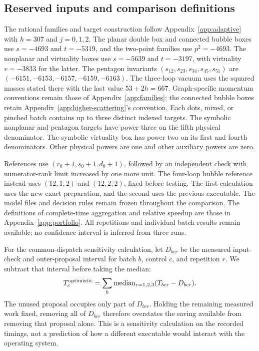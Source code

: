 \subsection{Reserved inputs and comparison definitions}
The rational families and target construction follow Appendix~\ref{app:adaptive} with $h=307$ and $j=0,1,2$. The planar double box and connected bubble boxes use $s=-4693$ and $t=-5319$, and the two-point families use $p^2=-4693$. The nonplanar and virtuality boxes use $s=-5639$ and $t=-3197$, with virtuality $v=-3833$ for the latter. The pentagon invariants $(s_{12},s_{23},s_{34},s_{45},s_{51})$ are $(-6151,-6153,-6157,-6159,-6163)$. The three-loop vacuum uses the squared masses stated there with the last value $53+2h=667$. Graph-specific momentum conventions remain those of Appendix~\ref{app:families}; the connected bubble boxes retain Appendix~\ref{app:higher-scattering}'s convention. Each dots, mixed, or pinched batch contains up to three distinct indexed targets. The symbolic nonplanar and pentagon targets have power three on the fifth physical denominator. The symbolic virtuality box has power two on its first and fourth denominators. Other physical powers are one and other auxiliary powers are zero.

References use $(r_0+1,s_0+1,d_0+1)$, followed by an independent check with numerator-rank limit increased by one more unit. The four-loop bubble reference instead uses $(12,1,2)$ and $(12,2,2)$, fixed before testing. The first calculation uses the new exact preparation, and the second uses the previous executable. The model files and decision rules remain frozen throughout the comparison. The definitions of complete-time aggregation and relative speedup are those in Appendix~\ref{app:portfolio}. All repetitions and individual batch results remain available; no confidence interval is inferred from three runs.

For the common-dispatch sensitivity calculation, let $D_{bcr}$ be the measured input-check and outer-proposal interval for batch $b$, control $c$, and repetition $r$. We subtract that interval before taking the median:
\begin{equation}
T_c^{\rm optimistic}=\sum_b\operatorname{median}_{r=1,2,3}(T_{bcr}-D_{bcr}).
\end{equation}
The unused proposal occupies only part of $D_{bcr}$. Holding the remaining measured work fixed, removing all of $D_{bcr}$ therefore overstates the saving available from removing that proposal alone. This is a sensitivity calculation on the recorded timings, not a prediction of how a different executable would interact with the operating system.
